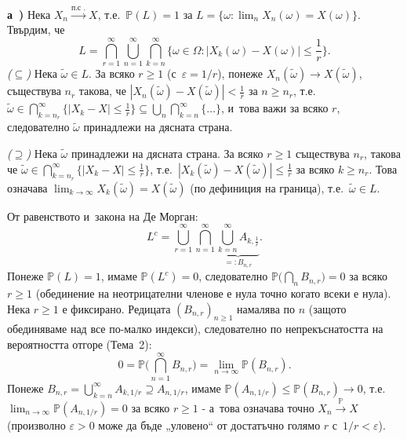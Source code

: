 \begin{proofbox}
\textbf{а~)} Нека $X_n\xrightarrow{\text{п.с~.}}X$, т.е.\ $\mathbb
P(L)=1$ за $L=\{\omega:\lim_n X_n(\omega)=X(\omega)\}$. Твърдим, че
\[
  L = \bigcap_{r=1}^{\infty}\bigcup_{n=1}^{\infty}\bigcap_{k=n}^{\infty} \Big\{\omega\in\Omega : |X_k(\omega)-X(\omega)|\le\frac1r\Big\}.
\]
\emph{($\subseteq$)} Нека $\tilde\omega\in L$. За всяко $r\ge1$
(с~$\varepsilon=1/r$), понеже $X_n(\tilde\omega)\to X(\tilde\omega)$,
съществува $n_r$ такова, че $|X_n(\tilde\omega)-X(\tilde\omega)|<
\tfrac1r$ за $n\ge n_r$, т.е.\ $\tilde\omega\in\bigcap_{k=n_r}^{\infty}
\{|X_k-X|\le\tfrac1r\}\subseteq\bigcup_n\bigcap_{k=n}^{\infty}\{\dots\}$,
и~това важи за всяко $r$, следователно $\tilde\omega$ принадлежи на
дясната страна.

\emph{($\supseteq$)} Нека $\tilde\omega$ принадлежи на дясната
страна. За всяко $r\ge1$ съществува $n_r$, такова че $\tilde\omega\in
\bigcap_{k=n_r}^{\infty}\{|X_k-X|\le\tfrac1r\}$, т.е.\
$|X_k(\tilde\omega)-X(\tilde\omega)|\le\tfrac1r$ за всяко $k\ge n_r$.
Това означава $\lim_{k\to\infty}X_k(\tilde\omega)=X(\tilde\omega)$
(по дефиниция на граница), т.е.\ $\tilde\omega\in L$.

От равенството и~закона на Де Морган:
\[
  L^c = \bigcup_{r=1}^{\infty}\bigcap_{n=1}^{\infty}\underbrace{\bigcup_{k=n}^{\infty}A_{k,\frac1r}}_{=:B_{n,r}}.
\]
Понеже $\mathbb P(L)=1$, имаме $\mathbb P(L^c)=0$, следователно
$\mathbb P\big(\bigcap_n B_{n,r}\big)=0$ за всяко $r\ge1$ (обединение
на неотрицателни членове е нула точно когато всеки е нула). Нека
$r\ge1$ е фиксирано. Редицата $(B_{n,r})_{n\ge1}$ намалява по $n$
(защото обединяваме над все по-малко индекси), следователно по
непрекъснатостта на вероятността отгоре (Тема~2):
\[
  0 = \mathbb P\Big(\bigcap_{n=1}^{\infty}B_{n,r}\Big) = \lim_{n\to\infty}\mathbb P(B_{n,r}).
\]
Понеже $B_{n,r}=\bigcup_{k=n}^{\infty}A_{k,1/r}\supseteq A_{n,1/r}$,
имаме $\mathbb P(A_{n,1/r})\le\mathbb P(B_{n,r})\to0$, т.е.
$\lim_{n\to\infty}\mathbb P(A_{n,1/r})=0$ за всяко $r\ge1$ - а~това
означава точно $X_n\xrightarrow{\mathbb P}X$ (произволно $\varepsilon>0$
може да бъде „уловено“ от достатъчно голямо $r$ с~$1/r<\varepsilon$).


\end{proofbox}
